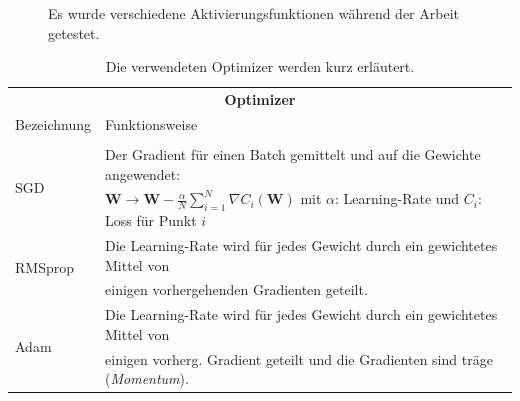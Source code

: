 \begin{figure}
	\caption{Es wurde verschiedene Aktivierungsfunktionen während der Arbeit getestet.}
	\label{Aktivierungsfunktionen}
\end{figure}
\begin{table}
	\centering
	\caption{Die verwendeten Optimizer werden kurz erläutert.}
	\begin{tabular}{ll}
		\multicolumn{2}{c}{\textbf{Optimizer}} \\
		Bezeichnung & Funktionsweise \\
		\hline\\[-10pt]
		\multirow{2}{*}{SGD}& Der Gradient für einen Batch gemittelt und auf die Gewichte angewendet:\\
		&  $\textbf{W} \rightarrow \textbf{W} - \frac{\alpha}{N}\sum_{i=1}^{N}\nabla C_i(\textbf{W})$ mit $\alpha$: Learning-Rate und $C_i$: Loss für Punkt $i$ \\[5pt]
		\multirow{2}{*}{RMSprop \cite{RMSprop}} & Die Learning-Rate wird für jedes Gewicht durch ein gewichtetes Mittel von \\
		& einigen vorhergehenden Gradienten geteilt. \\[5pt]
		\multirow{2}{*}{Adam \cite{Adam}} & Die Learning-Rate wird für jedes Gewicht durch ein gewichtetes Mittel von \\
		&einigen vorherg. Gradient geteilt und die Gradienten sind träge (\textit{Momentum}). \\
		\hline 
	\end{tabular}
	\label{optimizer}
\end{table}
